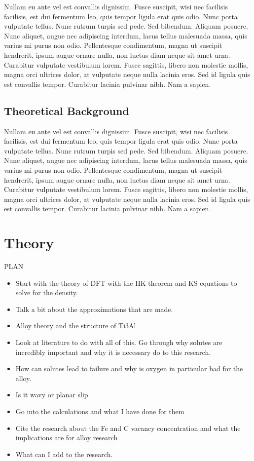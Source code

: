 \documentclass[a4paper,11pt]{article}
\numberwithin{equation}{chapter}
\numberwithin{listing}{chapter}
\begin{document}
Nullam eu ante vel est convallis dignissim.  Fusce suscipit, wisi nec facilisis facilisis, est dui fermentum leo, quis tempor ligula erat quis odio.  Nunc porta vulputate tellus.  Nunc rutrum turpis sed pede.  Sed bibendum.  Aliquam posuere.  Nunc aliquet, augue nec adipiscing interdum, lacus tellus malesuada massa, quis varius mi purus non odio.  Pellentesque condimentum, magna ut suscipit hendrerit, ipsum augue ornare nulla, non luctus diam neque sit amet urna.  Curabitur vulputate vestibulum lorem.  Fusce sagittis, libero non molestie mollis, magna orci ultrices dolor, at vulputate neque nulla lacinia eros.  Sed id ligula quis est convallis tempor.  Curabitur lacinia pulvinar nibh.  Nam a sapien.

\subsection{Theoretical Background}
\label{sec:org04c7a17}

Nullam eu ante vel est convallis dignissim.  Fusce suscipit, wisi nec facilisis facilisis, est dui fermentum leo, quis tempor ligula erat quis odio.  Nunc porta vulputate tellus.  Nunc rutrum turpis sed pede.  Sed bibendum.  Aliquam posuere.  Nunc aliquet, augue nec adipiscing interdum, lacus tellus malesuada massa, quis varius mi purus non odio.  Pellentesque condimentum, magna ut suscipit hendrerit, ipsum augue ornare nulla, non luctus diam neque sit amet urna.  Curabitur vulputate vestibulum lorem.  Fusce sagittis, libero non molestie mollis, magna orci ultrices dolor, at vulputate neque nulla lacinia eros.  Sed id ligula quis est convallis tempor.  Curabitur lacinia pulvinar nibh.  Nam a sapien.

\section{Theory}
\label{sec:orgfe6f90f}

PLAN 

\begin{itemize}
\item Start with the theory of DFT with the HK theorem and KS equations to solve
for the density.
\item Talk a bit about the approximations that are made.
\item Alloy theory and the structure of Ti3Al
\item Look at literature to do with all of this. Go through why solutes are
incredibly important and why it is necessary do to this research.
\item How can solutes lead to failure and why is oxygen in particular bad for the alloy.
\item Is it wavy or planar slip
\item Go into the calculations and what I have done for them
\item Cite the research about the Fe and C vacancy concentration and what the
implications are for alloy research
\item What can I add to the research.
\end{itemize}
\end{document}
